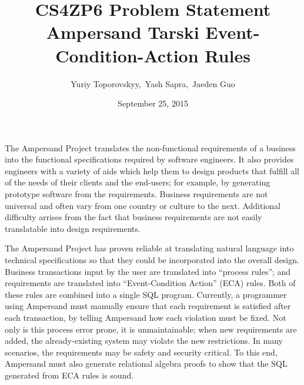 \documentclass[12pt]{article}
\begin{document}
\title{CS4ZP6 Problem Statement \\ Ampersand Tarski Event-Condition-Action Rules } 
\author{Yuriy Toporovskyy,\ Yash Sapra,\ Jaeden Guo}
\date{September 25, 2015}
\thispagestyle{empty}
\maketitle


The Ampersand Project translates the non-functional requirements of a
business into the functional specifications required by software engineers. It
also provides engineers with a variety of aids which help them to design
products that fulfill all of the needs of their clients and the end-users; for
example, by generating prototype software from the requirements.
Business requirements are not universal and often vary from one country or
culture to the next. Additional difficulty arrises from the fact that business
requirements are not easily translatable into design requirements. 

The Ampersand Project has proven reliable at translating natural
language into technical specifications so that they could be incorporated into
the overall design. Business transactions input by the user are translated into
``process rules''; and requirements are translated into ``Event-Condition
Action'' (ECA) rules. Both of these rules are combined into a single SQL
program. Currently, a programmer using Ampersand must manually ensure that each
requirement is satisfied after each transaction, by telling Ampersand how each
violation must be fixed. Not only is this process error prone, it is
unmaintainable; when new requirements are added, the already-existing system may
violate the new restrictions. In many scenarios, the requirements may be safety
and security critical. To this end, Ampersand must also generate relational
algebra proofs to show that the SQL generated from ECA rules is sound. 
\end{document}
